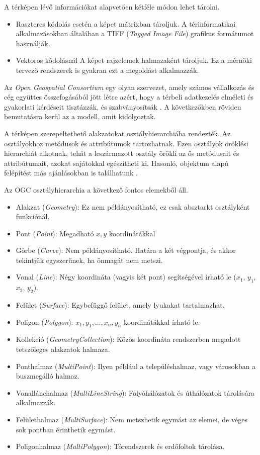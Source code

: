 A térképen lévő információkat alapvetően kétféle módon lehet tárolni.
\begin{itemize}
\item Raszteres kódolás esetén a képet mátrixban tároljuk. A térinformatikai alkalmazásokban általában a TIFF (\textit{Tagged Image File}) grafikus formátumot használják.
\item Vektoros kódolásnál A képet rajzelemek halmazaként tároljuk. Ez a mérnöki tervező rendszerek is gyakran ezt a megoldást alkalmazzák.
\end{itemize}

Az \textit{Open Geospatial Consortium} egy olyan szervezet, amely számos vállalkozás és cég együttes összefogásából jött létre azért, hogy a térbeli adatkezelés elméleti és gyakorlati kérdéseit tisztázzák, és szabványosítsák \cite{OGC}. A következőkben röviden bemutatásra kerül az a modell, amit kidolgoztak.

A térképen szerepeltethető alakzatokat osztályhierarchiába rendezték. Az osztályokhoz metódusok és attribútumok tartozhatnak. Ezen osztályok öröklési hierarchiát alkotnak, tehát a leszármazott osztály örökli az ős metódusait és attribútumait, azokat sajátokkal egészítheti ki. Hasonló, objektum alapú felépítést más ajánlásokban is találhatunk \cite{Geo}.

Az OGC osztályhierarchia a következő fontos elemekből áll.
\begin{itemize}  
\item Alakzat (\textit{Geometry}): Ez nem példányosítható, ez csak absztarkt osztályként funkciónál.
\item Pont (\textit{Point}): Megadható $x, y$ koordinátákkal
\item Görbe (\textit{Curve}): Nem példányosítható. Határa a két végpontja, és akkor tekintjük egyszerűnek, ha önmagát nem metszi.
\item Vonal (\textit{Line}): Négy koordináta (vagyis két pont) segítségével írható le ($x_1$, $y_1$, $x_2$, $y_2$).
\item Felület (\textit{Surface}): Egybefüggő felület, amely lyukakat tartalmazhat.
\item Poligon (\textit{Polygon}): $x_1, y_1, \ldots, x_n, y_n$ koordinátákkal írható le.
\item Kollekció (\textit{GeometryCollection}): Közös koordináta rendszerben megadott tetszőleges alakzatok halmaza.
\item Ponthalmaz (\textit{MultiPoint}): Ilyen például a településhalmaz, vagy városokban a buszmegálló halmaz. 
\item Vonallánchalmaz (\textit{MultiLineString}): Folyóhálózatok és úthálózatok tárolására alkalmazzák.
\item Felülethalmaz (\textit{MultiSurface}): Nem metszhetik egymást az elemei, de véges sok pontban érinthetik egymást.
\item Poligonhalmaz (\textit{MultiPolygon}): Tórendszerek és erdőfoltok tárolása.
\end{itemize}

